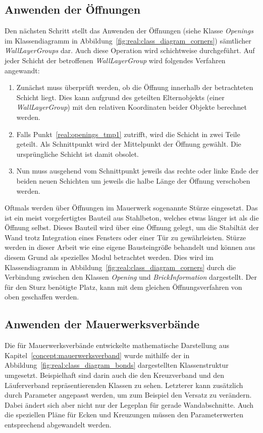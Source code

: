 \subsection{Anwenden der Öffnungen}\label{real:openings}
Den nächsten Schritt stellt das Anwenden der Öffnungen (siehe Klasse \textit{Openings} im Klassendiagramm in Abbildung~\ref{fig:real:class_diagram_corners}) sämtlicher \textit{WallLayerGroups} dar.
Auch diese Operation wird schichtweise durchgeführt.
Auf jeder Schicht der betroffenen \textit{WallLayerGroup} wird folgendes Verfahren angewandt:
\begin{enumerate}
  \item\label{real:openings_tmp1} Zunächst muss überprüft werden, ob die Öffnung innerhalb der betrachteten Schicht liegt. Dies kann aufgrund des geteilten Elternobjekts (einer \textit{WallLayerGroup}) mit den relativen Koordinaten beider Objekte berechnet werden. 
  \item Falls Punkt~\ref{real:openings_tmp1} zutrifft, wird die Schicht in zwei Teile geteilt. Als Schnittpunkt wird der Mittelpunkt der Öffnung gewählt. Die ursprüngliche Schicht ist damit obsolet.
  \item Nun muss ausgehend vom Schnittpunkt jeweils das rechte oder linke Ende der beiden neuen Schichten um jeweils die halbe Länge der Öffnung verschoben werden.
\end{enumerate}
Oftmals werden über Öffnungen im Mauerwerk sogenannte Stürze eingesetzt.
Das ist ein meist vorgefertigtes Bauteil aus Stahlbeton, welches etwas länger ist als die Öffnung selbst.
Dieses Bauteil wird über eine Öffnung gelegt, um die Stabiltät der Wand trotz Integration eines Fensters oder einer Tür zu gewährleisten.
Stürze werden in dieser Arbeit wie eine eigene Bausteingröße behandelt und können aus diesem Grund als spezielles Modul betrachtet werden.
Dies wird im Klassendiagramm in Abbildung~\ref{fig:real:class_diagram_corners} durch die Verbindung zwischen den Klassen \textit{Opening} und \textit{BrickInformation} dargestellt.
Der für den Sturz benötigte Platz, kann mit dem gleichen Öffnungsverfahren von oben geschaffen werden.

\subsection{Anwenden der Mauerwerksverbände}\label{real:verband}
Die für Mauerwerksverbände entwickelte mathematische Darstellung aus Kapitel~\ref{concept:mauerwerksverband} wurde mithilfe der in Abbildung~\ref{fig:real:class_diagram_bonds} dargestellten Klassenstruktur umgesetzt.
Beispielhaft sind darin auch die den Kreuzverband und den Läuferverband repräsentierenden Klassen zu sehen.
Letzterer kann zusätzlich durch Parameter angepasst werden, um zum Beispiel den Versatz zu verändern.
Dabei ändert sich aber nicht nur der Legeplan für gerade Wandabschnitte.
Auch die speziellen Pläne für Ecken und Kreuzungen müssen den Parameterwerten entsprechend abgewandelt werden.

